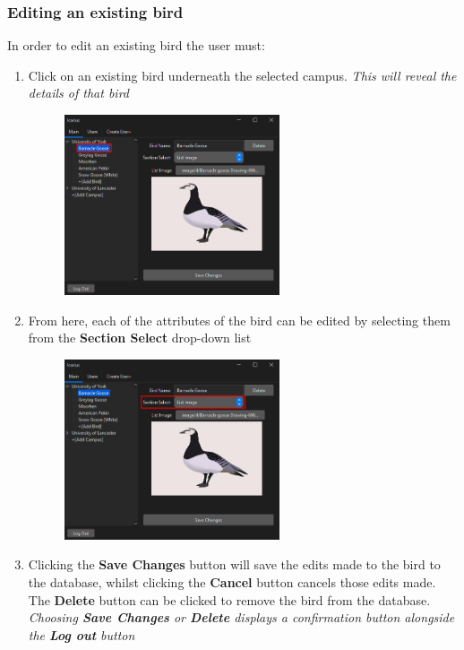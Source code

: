 \subsubsection{Editing an existing bird}
In order to edit an existing bird the user must:
\begin{enumerate}
    \item Click on an existing bird underneath the selected campus. \textit{This will reveal the details of that bird}
    \begin{figure}[H]
        \centering
        \includegraphics[width=0.6\textwidth]{MainTab/EditBird/editBirdView.PNG}
    \end{figure}

    \item From here, each of the attributes of the bird can be edited by selecting them from the \textbf{Section Select} drop-down list
    \begin{figure}[H]
        \centering
        \includegraphics[width=0.6\textwidth]{MainTab/EditBird/editBirdSection.PNG}
    \end{figure}

    \item Clicking the \textbf{Save Changes} button will save the edits made to the bird to the database, whilst clicking the \textbf{Cancel} button cancels those edits made. The \textbf{Delete} button can be clicked to remove the bird from the database. \textit{Choosing \textbf{Save Changes} or \textbf{Delete} displays a confirmation button alongside the \textbf{Log out} button}


\end{enumerate}
